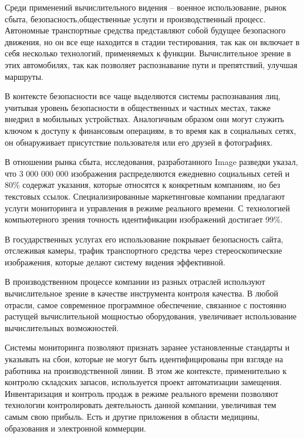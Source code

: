 Среди применений вычислительного видения – военное использование, рынок сбыта, безопасность,общественные услуги и производственный процесс.
Автономные транспортные средства представляют собой будущее безопасного движения, но он все еще находится в стадии тестирования,
так как он включает в себя несколько технологий, применяемых к функции. Вычислительное зрение в этих автомобилях,
так как позволяет распознавание пути и препятствий, улучшая маршруты.

В контексте безопасности все чаще выделяются системы распознавания лиц,
учитывая уровень безопасности в общественных и частных местах,
также внедрил в мобильных устройствах.
Аналогичным образом они могут служить ключом к доступу к финансовым операциям,
в то время как в социальных сетях, он обнаруживает присутствие пользователя или его друзей в фотографиях.

В отношении рынка сбыта, исследования, разработанного Image разведки указал,
что 3 000 000 000 изображения распределяются ежедневно социальных сетей и 80\%
содержат указания, которые относятся к конкретным компаниям, но без текстовых ссылок.
Специализированные маркетинговые компании предлагают услуги мониторинга и управления в режиме реального времени.
С технологией компьютерного зрения точность идентификации изображений достигает 99\%.

В государственных услугах его использование покрывает безопасность сайта, отслеживая камеры,
трафик транспортного средства через стереоскопические изображения,
которые делают систему видения эффективной.

В производственном процессе компании из разных отраслей используют
вычислительное зрение в качестве инструмента контроля качества.
В любой отрасли, самое современное программное обеспечение,
связанное с постоянно растущей вычислительной мощностью оборудования,
увеличивает использование вычислительных возможностей.

Системы мониторинга позволяют признать заранее установленные стандарты и указывать на сбои, которые не могут быть идентифицированы при взгляде на работника на производственной линии.
В этом же контексте, применительно к контролю складских запасов, используется проект автоматизации замещения.
Инвентаризация и контроль продаж в режиме реального времени позволяют технологии контролировать деятельность данной компании,
увеличивая тем самым свою прибыль. Есть и другие приложения в области медицины, образования и электронной коммерции.